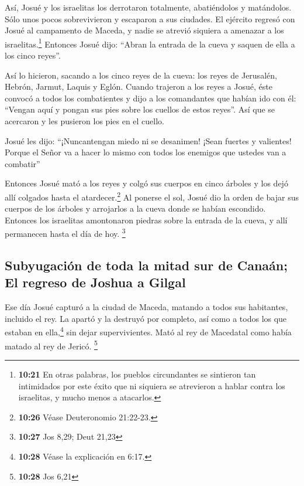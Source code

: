  Así, Josué y los israelitas los derrotaron totalmente,
abatiéndolos y matándolos. Sólo unos pocos sobrevivieron y escaparon a
sus ciudades.  El ejército regresó con Josué al
campamento de Maceda, y nadie se atrevió siquiera a amenazar a los
israelitas.\footnote{\textbf{10:21} En otras palabras, los pueblos
  circundantes se sintieron tan intimidados por este éxito que ni
  siquiera se atrevieron a hablar contra los israelitas, y mucho menos a
  atacarlos.}  Entonces Josué dijo: ``Abran la entrada de
la cueva y saquen de ella a los cinco reyes''.

 Así lo hicieron, sacando a los cinco reyes de la cueva:
los reyes de Jerusalén, Hebrón, Jarmut, Laquis y Eglón. 
Cuando trajeron a los reyes a Josué, éste convocó a todos los
combatientes y dijo a los comandantes que habían ido con él: ``Vengan
aquí y pongan sus pies sobre los cuellos de estos reyes''. Así que se
acercaron y les pusieron los pies en el cuello.

 Josué les dijo: ``¡Nuncantengan miedo ni se desanimen!
¡Sean fuertes y valientes! Porque el Señor va a hacer lo mismo con todos
los enemigos que ustedes van a combatir''

 Entonces Josué mató a los reyes y colgó sus cuerpos en
cinco árboles y los dejó allí colgados hasta el atardecer.\footnote{\textbf{10:26}
  Véase Deuteronomio 21:22-23.}  Al ponerse el sol, Josué
dio la orden de bajar sus cuerpos de los árboles y arrojarlos a la cueva
donde se habían escondido. Entonces los israelitas amontonaron piedras
sobre la entrada de la cueva, y allí permanecen hasta el día de hoy.
\footnote{\textbf{10:27} Jos 8,29; Deut 21,23}

\hypertarget{subyugaciuxf3n-de-toda-la-mitad-sur-de-canauxe1n-el-regreso-de-joshua-a-gilgal}{%
\subsection{Subyugación de toda la mitad sur de Canaán; El regreso de
Joshua a
Gilgal}\label{subyugaciuxf3n-de-toda-la-mitad-sur-de-canauxe1n-el-regreso-de-joshua-a-gilgal}}

 Ese día Josué capturó a la ciudad de Maceda, matando a
todos sus habitantes, incluido el rey. La apartó y la destruyó por
completo, así como a todos los que estaban en ella,\footnote{\textbf{10:28}
  Véase la explicación en 6:17.} sin dejar supervivientes. Mató al rey
de Macedatal como había matado al rey de Jericó. \footnote{\textbf{10:28}
  Jos 6,21}


